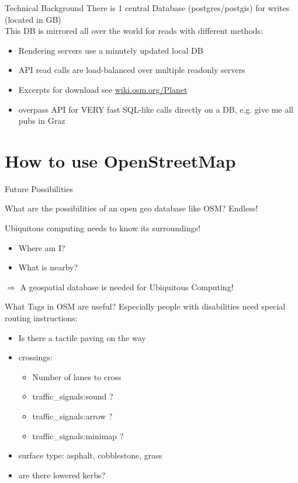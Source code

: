 \documentclass{beamer}
\begin{document}
    
\begin{frame}{Technical Background}
There is 1 central Database (postgres/postgis) for writes (located in GB)\\
This DB is mirrored all over the world for reads with different methods:

\begin{itemize}
  \item Rendering servers use a minutely updated local DB
  \item API read calls are load-balanced over multiple readonly servers
  \item Excerpts for download see \href{http://wiki.osm.org/Planet}{wiki.osm.org/Planet}
  \item overpass API for VERY fast SQL-like calls directly on a DB, e.g. give me all pubs in Graz
\end{itemize}

\end{frame}


\section{How to use OpenStreetMap}

\begin{frame}{Future Possibilities}

  What are the possibilities of an open geo database like OSM?
  \pause
  Endless!

Ubiquitous computing needs to know its surroundings!
  \begin{itemize}
    \item Where am I?
    \item What is nearby?
  \end{itemize}

  $\Rightarrow$ A geospatial database is needed for Ubiquitous Computing!

\end{frame}

\begin{frame}{What Tags in OSM are useful?}
  Especially people with disabilities need special routing instructions:
  \begin{itemize}
    \item Is there a tactile paving on the way
    \item crossings:
    \begin{itemize}
      \item Number of lanes to cross
      \item traffic\_signals:sound ?
      \item traffic\_signals:arrow ?
      \item traffic\_signals:minimap ?
    \end{itemize}
    \item surface type: asphalt, cobblestone, grass
    \item are there lowered kerbs?
  \end{itemize}
\end{frame}
\end{document}
